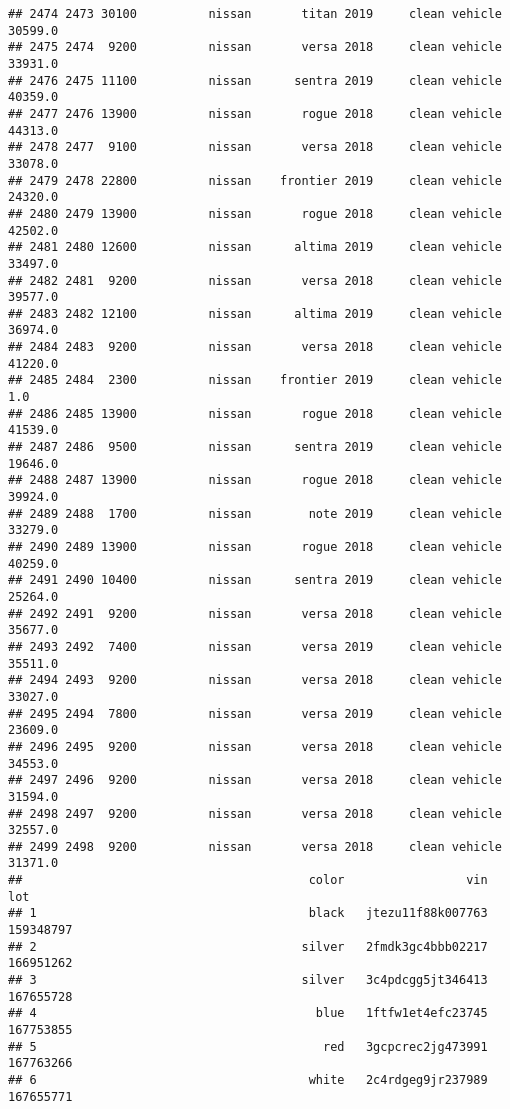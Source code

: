 \documentclass[
]{article}
\begin{document}
\begin{verbatim}
## 2474 2473 30100          nissan       titan 2019     clean vehicle   30599.0
## 2475 2474  9200          nissan       versa 2018     clean vehicle   33931.0
## 2476 2475 11100          nissan      sentra 2019     clean vehicle   40359.0
## 2477 2476 13900          nissan       rogue 2018     clean vehicle   44313.0
## 2478 2477  9100          nissan       versa 2018     clean vehicle   33078.0
## 2479 2478 22800          nissan    frontier 2019     clean vehicle   24320.0
## 2480 2479 13900          nissan       rogue 2018     clean vehicle   42502.0
## 2481 2480 12600          nissan      altima 2019     clean vehicle   33497.0
## 2482 2481  9200          nissan       versa 2018     clean vehicle   39577.0
## 2483 2482 12100          nissan      altima 2019     clean vehicle   36974.0
## 2484 2483  9200          nissan       versa 2018     clean vehicle   41220.0
## 2485 2484  2300          nissan    frontier 2019     clean vehicle       1.0
## 2486 2485 13900          nissan       rogue 2018     clean vehicle   41539.0
## 2487 2486  9500          nissan      sentra 2019     clean vehicle   19646.0
## 2488 2487 13900          nissan       rogue 2018     clean vehicle   39924.0
## 2489 2488  1700          nissan        note 2019     clean vehicle   33279.0
## 2490 2489 13900          nissan       rogue 2018     clean vehicle   40259.0
## 2491 2490 10400          nissan      sentra 2019     clean vehicle   25264.0
## 2492 2491  9200          nissan       versa 2018     clean vehicle   35677.0
## 2493 2492  7400          nissan       versa 2019     clean vehicle   35511.0
## 2494 2493  9200          nissan       versa 2018     clean vehicle   33027.0
## 2495 2494  7800          nissan       versa 2019     clean vehicle   23609.0
## 2496 2495  9200          nissan       versa 2018     clean vehicle   34553.0
## 2497 2496  9200          nissan       versa 2018     clean vehicle   31594.0
## 2498 2497  9200          nissan       versa 2018     clean vehicle   32557.0
## 2499 2498  9200          nissan       versa 2018     clean vehicle   31371.0
##                                        color                 vin       lot
## 1                                      black   jtezu11f88k007763 159348797
## 2                                     silver   2fmdk3gc4bbb02217 166951262
## 3                                     silver   3c4pdcgg5jt346413 167655728
## 4                                       blue   1ftfw1et4efc23745 167753855
## 5                                        red   3gcpcrec2jg473991 167763266
## 6                                      white   2c4rdgeg9jr237989 167655771

\end{verbatim}
\end{document}
